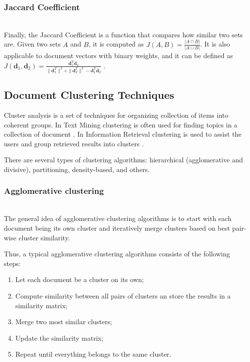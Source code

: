 \subsubsection{Jaccard Coefficient} \ \\

Finally, the Jaccard Coefficient is a function that compares how similar
two sets are. Given two sets $A$ and $B$, it is computed as
$J(A, B) = \frac{|A \cap B|}{|A \cup B|}$.
It is also applicable to document vectors with binary weights, and it can
be defined as $J(\mathbf d_1, \mathbf d_2) =
\frac{\mathbf d_1^T \mathbf d_2}{\| \mathbf d_1^T \|^2 + \| \mathbf d_2^T \|^2 - \mathbf d_1^T \mathbf d_2}$ \cite{manning2008introduction}.



\subsection{Document Clustering Techniques} \label{sec:doc-clustering}

Cluster analysis is a set of techniques for organizing collection
of items into coherent groups. In Text Mining clustering is often
used for finding topics in a collection of document \cite{aggarwal2012survey}.
In Information Retrieval clustering is used to assist the users and group
retrieved results into clusters \cite{cutting1992scatter}.

There are several types of clustering algorithms:
hierarchical (agglomerative and divisive), partitioning,
density-based, and others.


\subsubsection{Agglomerative clustering} \label{sec:clustering-heierarchical} \ \\

The general idea of agglomerative clustering algorithms is to start with
each document being its own cluster and iteratively merge clusters based
on best pair-wise cluster similarity.

Thus, a typical agglomerative clustering algorithms consists of the following steps:

\begin{enumerate}
\itemsep1pt\parskip0pt
  \item Let each document be a cluster on its own;
  \item Compute similarity between all pairs of clusters an store the
      results in a similarity matrix;
  \item Merge two most similar clusters;
  \item Update the similarity matrix;
  \item Repeat until everything belongs to the same cluster.
\end{enumerate}

